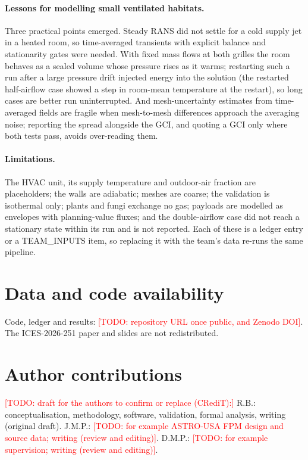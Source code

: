 \documentclass[11pt]{article}
\newcommand{\todo}[1]{\textcolor{red}{[TODO: #1]}}
\begin{document}
\paragraph{Lessons for modelling small ventilated habitats.} Three practical points emerged. Steady RANS did not
settle for a cold supply jet in a heated room, so time-averaged transients with explicit balance and stationarity
gates were needed. With fixed mass flows at both grilles the room behaves as a sealed volume whose pressure rises as
it warms; restarting such a run after a large pressure drift injected energy into the solution (the restarted
half-airflow case showed a step in room-mean temperature at the restart), so long cases are better run uninterrupted. And mesh-uncertainty estimates
from time-averaged fields are fragile when mesh-to-mesh differences approach the averaging noise; reporting the
spread alongside the GCI, and quoting a GCI only where both tests pass, avoids over-reading them.

\paragraph{Limitations.} The HVAC unit, its supply temperature and outdoor-air fraction are placeholders; the walls
are adiabatic; meshes are coarse; the validation is isothermal only; plants and fungi exchange no gas; payloads are
modelled as envelopes with planning-value fluxes; and the double-airflow case did not reach a stationary state within
its run and is not reported. Each of these is a ledger entry or a TEAM\_INPUTS item, so replacing it with the team's
data re-runs the same pipeline.

\section*{Data and code availability}
Code, ledger and results: \todo{repository URL once public, and Zenodo DOI}. The ICES-2026-251 paper and slides
are not redistributed.

\section*{Author contributions}
\todo{draft for the authors to confirm or replace (CRediT):} R.B.: conceptualisation, methodology, software,
validation, formal analysis, writing (original draft). J.M.P.: \todo{for example ASTRO-USA FPM design and source
data; writing (review and editing)}. D.M.P.: \todo{for example supervision; writing (review and editing)}.
\end{document}
